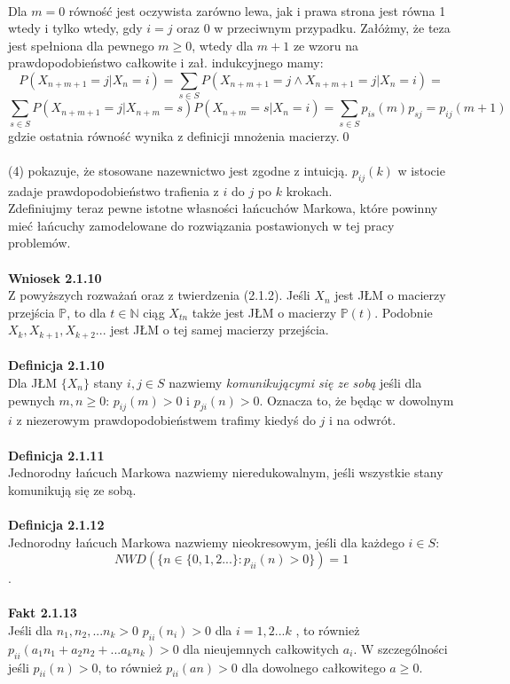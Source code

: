 \documentclass[a4paper]{article}
\begin{document}
\\Dla $m=0$ równość jest oczywista zarówno lewa, jak i prawa strona jest równa 1 wtedy i tylko wtedy, gdy $i = j$ oraz 0 w przeciwnym przypadku. Załóżmy, że teza jest spełniona dla pewnego $m \geq 0$, wtedy dla $m+1$ ze wzoru na prawdopodobieństwo całkowite i zał. indukcyjnego mamy: $$P(X_{n+m+1}=j|X_n = i) = \sum\limits_{s \in S} P(X_{n+m+1}=j \land X_{n+m+1}=j |X_n = i) =$$  $$\sum\limits_{s \in S} P(X_{n+m+1}=j | X_{n+m}=s)P(X_{n+m}=s|X_n = i) = \sum\limits_{s \in S} p_{is}(m)p_{sj} = p_{ij}(m+1)$$
gdzie ostatnia równość wynika z definicji mnożenia macierzy.\qed
\\\\
(4) pokazuje, że stosowane nazewnictwo jest zgodne z intuicją. $p_{ij}(k)$ w istocie zadaje prawdopodobieństwo trafienia z $i$ do $j$ po $k$ krokach.
\\Zdefiniujmy teraz pewne istotne własności łańcuchów Markowa, które powinny mieć łańcuchy zamodelowane do rozwiązania postawionych w tej pracy problemów.
\\\\
\textbf{Wniosek 2.1.10}\\
Z powyższych rozważań oraz z twierdzenia (2.1.2). Jeśli $X_n$ jest JŁM o macierzy przejścia $\mathbb{P}$, to dla $t \in \mathbb{N}$ ciąg $X_{tn}$ także jest JŁM o macierzy $\mathbb{P}(t)$. Podobnie $X_{k}, X_{k+1}, X_{k+2}...$ jest JŁM o tej samej macierzy przejścia.
\\\\
\textbf{Definicja 2.1.10}\\
Dla JŁM $\{X_n\}$ stany $i,j \in S$ nazwiemy \textit{komunikującymi się ze sobą} jeśli dla pewnych $m,n \geq 0$: $p_{ij}(m) > 0$ i $p_{ji}(n) > 0$. 
Oznacza to, że będąc w dowolnym $i$ z niezerowym prawdopodobieństwem trafimy kiedyś do $j$ i na odwrót.
\\\\
\textbf{Definicja 2.1.11}\\
Jednorodny łańcuch Markowa nazwiemy nieredukowalnym, jeśli wszystkie stany komunikują się ze sobą.
\\\\
\textbf{Definicja 2.1.12}\\
Jednorodny łańcuch Markowa nazwiemy nieokresowym, jeśli dla każdego $i \in S$: $$NWD(\{n \in \{0, 1, 2...\}:  p_{ii}(n) > 0\}) = 1$$.
\\\\
\textbf{Fakt 2.1.13}\\
Jeśli dla $n_1, n_2, ... n_k > 0$ $p_{ii}(n_i) > 0$ dla $i=1,2...k$ , to również $p_{ii}(a_1n_1 + a_2n_2 + ... a_kn_k) > 0$ dla nieujemnych całkowitych $a_i$. W szczególności jeśli $p_{ii}(n) > 0$, to również $p_{ii}(an) > 0$ dla dowolnego całkowitego $a \geq 0$.\\
\end{document}
